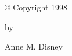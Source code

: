 
\newpage
\par\vspace*{6.5in}

\begin{center}

\copyright\/ Copyright 1998

by

Anne M. Disney 

\end{center}



